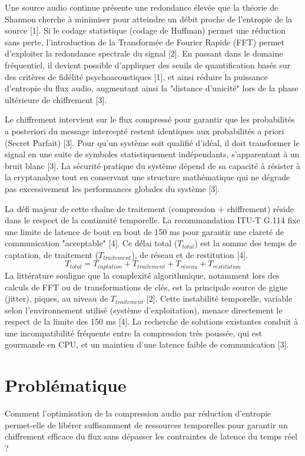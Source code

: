 \documentclass[11pt]{article}
\begin{document}
Une source audio continue présente une redondance élevée que la théorie de Shannon cherche à minimiser pour atteindre un débit proche de l'entropie de la source [1]. Si le codage statistique (codage de Huffman) permet une réduction sans perte, l'introduction de la Transformée de Fourier Rapide (FFT) permet d'exploiter la redondance spectrale du signal [2]. En passant dans le domaine fréquentiel, il devient possible d'appliquer des seuils de quantification basés sur des critères de fidélité psychoacoustiques [1], et ainsi réduire la puissance d'entropie du flux audio, augmentant ainsi la "distance d'unicité" lors de la phase ultérieure de chiffrement [3].

Le chiffrement intervient sur le flux compressé pour garantir que les probabilités a posteriori du message intercepté restent identiques aux probabilités a priori (Secret Parfait) [3]. Pour qu'un système soit qualifié d'idéal, il doit transformer le signal en une suite de symboles statistiquement indépendants, s'apparentant à un bruit blanc [3]. La sécurité pratique du système dépend de sa capacité à résister à la cryptanalyse tout en conservant une structure mathématique qui ne dégrade pas excessivement les performances globales du système [3].

La défi majeur de cette chaîne de traitement (compression + chiffrement) réside dans le respect de la continuité temporelle. La recommandation ITU-T G.114 fixe une limite de latence de bout en bout de 150 ms pour garantir une clareté de communication "acceptable" [4]. Ce délai total ($T_{total}$) est la somme des temps de captation, de traitement ($T_{traitement}$), de réseau et de restitution [4].$$T_{total} = T_{captation} + T_{traitement} + T_{réseau} + T_{restitution}$$La littérature souligne que la complexité algorithmique, notamment lors des calculs de FFT ou de transformations de clés, est la principale source de gigue (jitter), piques, au niveau de $T_{traitement}$ [2]. Cette instabilité temporelle, variable selon l'environnement utilisé (système d'exploitation), menace directement le respect de la limite des 150 ms [4]. La recherche de solutions existantes conduit à une incompatibilité fréquente entre la compression très poussée, qui est gourmande en CPU, et un maintien d'une latence faible de communication [3]. 

\section*{Problématique}
Comment l'optimisation de la compression audio par réduction d'entropie permet-elle de libérer suffisamment de ressources temporelles pour garantir un chiffrement efficace du flux sans dépasser les contraintes de latence du temps réel ?
\end{document}
